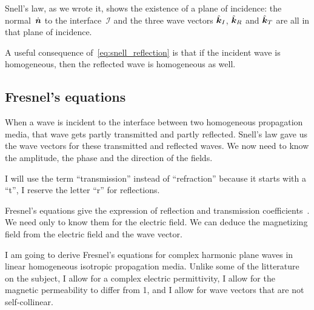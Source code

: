 Snell's law, as we wrote it, shows the existence of a plane of incidence: the normal~$\dot{\bm{n}}$ to the interface~$\mathcal{I}$ and the three wave vectors $\hat{\bm{k}}_I$, $\hat{\bm{k}}_R$ and $\hat{\bm{k}}_T$ are all in that plane of incidence.

A useful consequence of~\cref{eq:snell_reflection} is that if the incident wave is homogeneous, then the reflected wave is homogeneous as well.







\subsection{Fresnel's equations}

When a wave is incident to the interface between two homogeneous propagation media, that wave gets partly transmitted and partly reflected.
Snell's law gave us the wave vectors for these transmitted and reflected waves.
We now need to know the amplitude, the phase and the direction of the fields.

I will use the term ``transmission'' instead of ``refraction'' because it starts with a ``t'', I reserve the letter ``r'' for reflections.

Fresnel's equations give the expression of reflection and transmission coefficients~\parencite{hecht2002optics}.
We need only to know them for the electric field.
We can deduce the magnetizing field from the electric field and the wave vector.

I am going to derive Fresnel's equations for complex harmonic plane waves in linear homogeneous isotropic propagation media.
Unlike some of the litterature on the subject, I allow for a complex electric permittivity, I allow for the magnetic permeability to differ from 1, and I allow for wave vectors that are not self-collinear.


